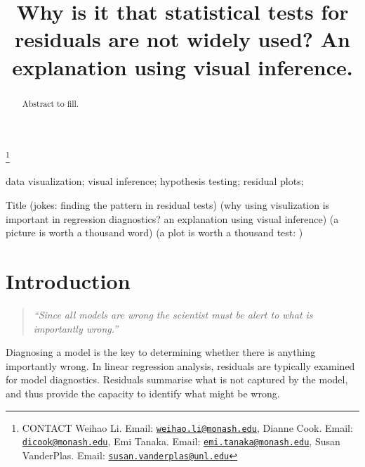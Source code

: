 \documentclass[]{interact}
\theoremstyle{plain}%
\theoremstyle{definition}
\theoremstyle{remark}
\begin{document}

\title{Why is it that statistical tests for residuals are not widely
used? An explanation using visual inference.}


\author{
}

\thanks{CONTACT Weihao
Li. Email: \href{mailto:weihao.li@monash.edu}{\nolinkurl{weihao.li@monash.edu}}, Dianne
Cook. Email: \href{mailto:dicook@monash.edu}{\nolinkurl{dicook@monash.edu}}, Emi
Tanaka. Email: \href{mailto:emi.tanaka@monash.edu}{\nolinkurl{emi.tanaka@monash.edu}}, Susan
VanderPlas. Email: \href{mailto:susan.vanderplas@unl.edu}{\nolinkurl{susan.vanderplas@unl.edu}}}

\maketitle

\begin{abstract}
Abstract to fill.
\end{abstract}

\begin{keywords}
data visualization; visual inference; hypothesis testing; residual
plots;
\end{keywords}

Title (jokes: finding the pattern in residual tests) (why using
visulization is important in regression diagnostics? an explanation
using visual inference) (a picture is worth a thousand word) (a plot is
worth a thousand test: )

\hypertarget{introduction}{%
\section{Introduction}\label{introduction}}

\begin{quote}
\emph{``Since all models are wrong the scientist must be alert to what
is importantly wrong.''} \citep{box1976science}
\end{quote}

Diagnosing a model is the key to determining whether there is anything
importantly wrong. In linear regression analysis, residuals are
typically examined for model diagnostics. Residuals summarise what is
not captured by the model, and thus provide the capacity to identify
what might be wrong.
\end{document}
